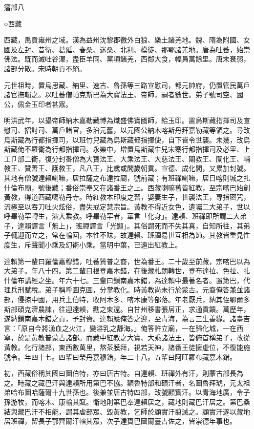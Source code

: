 
\begin{pinyinscope}
籓部八

○西藏

西藏，禹貢雍州之域。漢為益州沈黎郡徼外白狼、樂土諸羌地。魏、隋為附國、女國及左封、昔衛、葛延、春桑、迷桑、北利、模徒、那鄂諸羌地。唐為吐蕃，始崇佛法。既而滅吐谷渾，盡臣羊同、黨項諸羌，西鄰大食，幅員萬餘里。唐末衰弱，諸部分散。宋時朝貢不絕。

元世祖時，置烏思藏、納里、速古、魯孫等三路宣慰司，都元帥府，仍置管民萬戶諸官撫輯之。以吐蕃僧帕克斯巴為大寶法王、帝師，嗣者數世。弟子號司空、國公，佩金玉印者甚眾。

明洪武年，以攝帝師納木嘉勒藏博為熾盛佛寶國師，給玉印。置烏斯藏指揮司及宣慰司、招討司、萬戶諸官，多沿元舊，以元國公納木喀斯丹拜嘉勒藏等領之。尋改烏斯藏為行都指揮司，以班竹兒藏為烏斯藏都指揮使，自下皆令世襲。未幾，改烏斯藏俺不羅衛為行都指揮司。永樂中，增置烏斯藏牛兒宋寨行都指揮司及必里、上工⼙部二衛，復分封番僧為大寶法王、大乘法王、大慈法王、闡教王、闡化王、輔教王、贊善王、護教王，凡八王，比歲或間歲朝貢。宣德、成化間，又累加封號。其地有僧號達賴喇嘛，居拉薩之布達拉廟，號前藏；有班禪喇嘛，居日喀則城之扎什倫布廟，號後藏；番俗崇奉又在諸番王之上。西藏喇嘛舊皆紅教，至宗喀巴始創黃教，得道西藏噶勒丹寺。時紅教本印度之習，娶妻生子，世襲法王，專指密咒，流極至以吞刀吐火炫俗，盡失戒定慧宗旨。黃教不得近女色，遺囑二大弟子，世以呼畢勒罕轉生，演大乘教。呼畢勒罕者，華言「化身」。達賴、班禪即所謂二大弟子，達賴譯言「無上」，班禪譯言「光顯」。其俗謂死而不失其真，自知所往，其弟子輒迎而立之，常在輪回，本性不昧，故達賴、班禪易世互相為師。其教皆重見性度生，斥聲聞小乘及幻術小乘。當明中葉，已遠出紅教上。

達賴第一輩曰羅倫嘉穆錯，吐蕃贊普之裔，世為番王。二十歲至前藏，宗喀巴以為大弟子。年八十四。第二輩曰根登嘉木錯，在後藏札朗轉世，登布達拉、色拉、扎什倫布講經之坐。年六十七。三輩曰鎖南嘉木錯，為達賴中最著名者。置第巴，代理兵刑賦稅。弟子稱呼圖克圖，分掌教化。時黃教尚未行於蒙古。元裔俺答兼並諸部，侵掠中國，用兵土伯特，收阿木多、喀木康等部落。年老厭兵，納其侄鄂爾多斯部碩克濟農諫，往迎達賴，勸之東還。自甘州移書張居正，求通貢饋。萬歷年，遂納鎖南嘉木錯之貢，予封賚。達賴應俺答之迎，至青海，為言三生善緣。諸臺吉言：「原自今將湧血之火江，變溢乳之靜海。」俺答許立廟，一在歸化城，一在西寧，於是黃教普蒙古諸部。而藏中紅教之大寶、大乘諸法王，皆俯首稱弟子，改從黃教。化行諸部，東西數萬里，熬茶膜拜，視若天神，諸番王徒擁虛位，不復能施號令。年四十七。四輩曰榮丹嘉穆錯，年二十八。五輩曰阿旺羅布藏嘉木錯。

初，西藏俗稱其國曰圖伯特，亦曰唐古特。自達賴、班禪外有汗，則蒙古部長為之。時藏之藏巴汗與達賴所用第巴不協。額魯特部和碩汗者，名圖魯拜琥，元太祖弟哈布圖哈薩爾十九世孫也。後兼並唐古特四部，改號顧實汗。以青海地廣，令子孫游牧，而喀木、康輸其賦。衛地則第巴奉達賴居之，藏地則藏巴汗居之。第巴桑結與藏巴汗不相能，謂其虐部眾、毀黃教，乞師於顧實汗翦滅之。顧實汗遂以藏地居班禪，留長子鄂齊爾汗轄其眾，次子達賚巴圖爾臺吉佐之，皆崇德年事也。


\end{pinyinscope}
